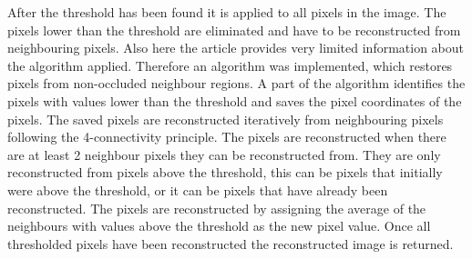 After the threshold has been found it is applied to all pixels in the image. The pixels lower than the threshold are eliminated and have to be reconstructed from neighbouring pixels. Also here the article provides very limited information about the algorithm applied. Therefore an algorithm was implemented, which restores pixels from non-occluded neighbour regions. A part of the algorithm identifies the pixels with values lower than the threshold and saves the pixel coordinates of the pixels. The saved pixels are  reconstructed iteratively from neighbouring pixels following the 4-connectivity principle. The pixels are reconstructed when there are at least 2 neighbour pixels they can be reconstructed from. They are only reconstructed from pixels above the threshold, this can be pixels that initially were above the threshold, or it can be pixels that have already been reconstructed. The pixels are reconstructed by assigning the average of the neighbours with values above the threshold as the new pixel value. Once all thresholded pixels have been reconstructed the reconstructed image is returned.

